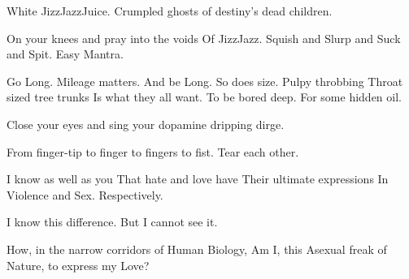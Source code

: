 \documentclass{article}
\begin{document}
White JizzJazzJuice. Crumpled ghosts of destiny's dead children.
\newline 
\newline

On your knees and  pray into the voids \newline Of JizzJazz. \newline
Squish and Slurp and Suck and Spit. \newline Easy Mantra. \newline
\newline


Go Long. Mileage matters. 
\newline 
And be Long. So does size. 
\newline 
Pulpy throbbing \newline Throat sized tree trunks \newline Is what they
all want. \newline To be bored deep. \newline For some hidden oil.
\newline \newline

Close your eyes and sing your dopamine dripping dirge. 
\newline
\newline

From finger-tip to finger to fingers to fist. Tear each other.
\newline
\newline

I know as well as you 
\newline
That hate and love have 
\newline
Their ultimate expressions 
\newline
In Violence and Sex. 
\newline
Respectively.
\newline

I know this difference.
\newline
But I cannot see it. 
\newline
\newline

How, in the narrow corridors of Human Biology, 
\newline 
Am I, this Asexual freak of Nature, to express my Love?
\end{document}
